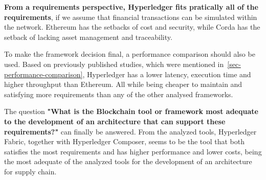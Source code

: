 \textbf{From a requirements perspective, Hyperledger fits pratically all of the requirements}, if we assume that financial transactions can be simulated within the network. Ethereum has the setbacks of cost and security, while Corda has the setback of lacking asset management and traceability.


To make the framework decision final, a performance comparison should also be used.  Based on previously published studies, which were mentioned in~\ref{sec-performance-comparison}, Hyperledger has a lower latency, execution time and higher throughput than Ethereum. All while being cheaper to maintain and satisfying more requirements than any of the other analysed frameworks.

\par The question \textbf{"What is the Blockchain tool or framework most adequate to the development of an architecture that can support these requirements?"} can finally be answered. From the analyzed tools, Hyperledger Fabric, together with Hyperledger Composer, seems to be the tool that both satisfies the most requirements and has higher performance and lower costs, being the most adequate of the analyzed tools for the development of an architecture for supply chain.





